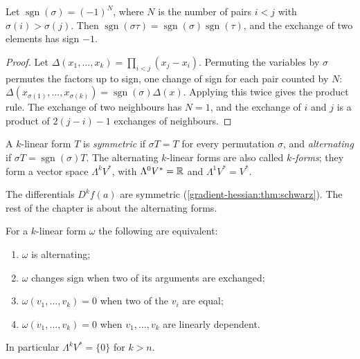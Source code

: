 \begin{notechapter}
\begin{lemma}\label{multilinear-algebra:lem:sign}
Let $\operatorname{sgn}(\sigma) = (-1)^N$, where $N$ is the number of
pairs $i < j$ with $\sigma(i) > \sigma(j)$. Then
$\operatorname{sgn}(\sigma\tau)
= \operatorname{sgn}(\sigma)\operatorname{sgn}(\tau)$, and the exchange
of two elements has sign $-1$.
\end{lemma}

\begin{proof}
Let $\Delta(x_1,\dots,x_k) = \prod_{i<j}(x_j - x_i)$. Permuting the
variables by $\sigma$ permutes the factors up to sign, one change of
sign for each pair counted by $N$:
$\Delta(x_{\sigma(1)},\dots,x_{\sigma(k)})
= \operatorname{sgn}(\sigma)\Delta(x)$. Applying this twice gives the
product rule. The exchange of two neighbours has $N = 1$, and the
exchange of $i$ and $j$ is a product of $2(j - i) - 1$ exchanges of
neighbours.
\end{proof}

\begin{definition}
\label{multilinear-algebra:def:alternating}
A $k$-linear form $T$ is \emph{symmetric} if $\sigma T = T$ for every
permutation $\sigma$, and \emph{alternating} if
$\sigma T = \operatorname{sgn}(\sigma)T$. The alternating $k$-linear
forms are also called \emph{$k$-forms}; they form a vector space
$\Lambda^kV^*$, with $\Lambda^0V^* = \mathbb{R}$ and $\Lambda^1V^* = V^*$.
\end{definition}

The differentials $D^kf(a)$ are symmetric
(\cref{gradient-hessian:thm:schwarz}). The rest of the chapter is about
the alternating forms.

\begin{proposition}\label{multilinear-algebra:prop:alternating}
For a $k$-linear form $\omega$ the following are equivalent:
\begin{enumerate}[nosep]
  \item $\omega$ is alternating;
  \item $\omega$ changes sign when two of its arguments are exchanged;
  \item $\omega(v_1,\dots,v_k) = 0$ when two of the $v_i$ are equal;
  \item $\omega(v_1,\dots,v_k) = 0$ when $v_1,\dots,v_k$ are linearly
        dependent.
\end{enumerate}
In particular $\Lambda^kV^* = \{0\}$ for $k > n$.
\end{proposition}


\end{notechapter}
